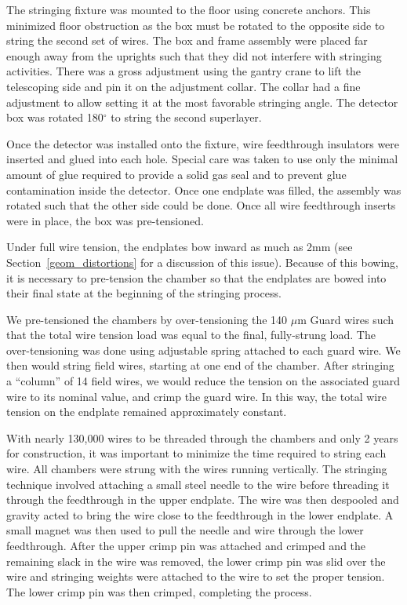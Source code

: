The stringing fixture was mounted to the floor using 
concrete anchors.  This minimized floor obstruction as the box must be 
rotated to the opposite side to string the second set of wires.  The box 
and frame assembly were placed far enough away from the uprights such that 
they did not interfere with stringing activities.  There was a gross 
adjustment using 
the gantry crane to lift the telescoping side and pin it on the adjustment 
collar.  The collar had a fine adjustment to allow setting it at the most 
favorable stringing angle.  The detector box was rotated 180$^\circ$ to 
string the second superlayer.

Once the detector was installed onto the fixture, wire feedthrough 
insulators were inserted and glued into each hole. Special care was 
taken to use only the minimal amount of glue required to provide a solid gas 
seal and to prevent glue contamination inside the detector.  Once one 
endplate was filled, the assembly was rotated such that the other side 
could be done.  Once all wire feedthrough inserts were in place, the box 
was pre-tensioned.

Under full wire tension, the endplates bow inward as much as 2mm 
(see Section~\ref{geom_distortions} for a discussion of this issue).
Because of this bowing, it is necessary to pre-tension the chamber
so that the endplates are bowed into their final state at the 
beginning of the stringing process.

We pre-tensioned the chambers by over-tensioning the 140 $\mu$m Guard
wires such that the total wire tension load was equal to the final, 
fully-strung load.  The over-tensioning was done using adjustable
spring attached to each guard wire. 
We then would string field wires, starting at one end of the chamber.
After stringing a ``column'' of 14 field wires, we would reduce the
tension on the associated guard wire to its nominal value, and crimp
the guard wire.  In this way, the total wire tension on the endplate
remained approximately constant.


With nearly 130,000 wires to be threaded through the chambers and only 2 years 
for construction, it was important to minimize the time required to string 
each wire.  All chambers were strung with 
the wires running vertically.  The stringing technique involved attaching a 
small steel needle to the wire before threading it through the feedthrough in 
the upper endplate.  The wire was then despooled and gravity acted to bring the 
wire close to the feedthrough in the lower endplate.  A small magnet was then 
used to pull the needle and wire through the lower feedthrough.  After the upper 
crimp pin was attached and crimped and the remaining slack in the wire was removed, the lower 
crimp pin was slid over the wire and stringing weights were attached to the wire to set the 
proper tension.  The lower crimp pin was then crimped, completing the process.


